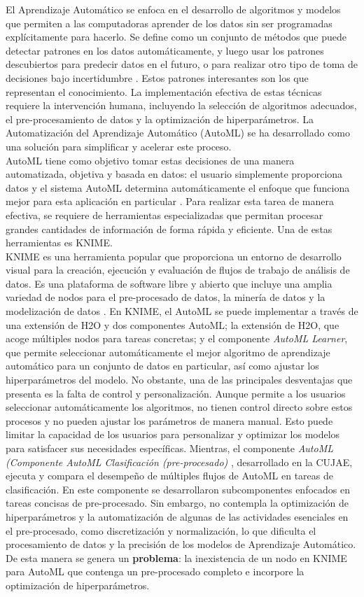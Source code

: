 El Aprendizaje Automático se enfoca en el desarrollo de algoritmos y modelos que permiten a las computadoras aprender de los datos sin ser programadas explícitamente para hacerlo. Se define como un conjunto de métodos que puede detectar patrones en los datos automáticamente, y luego usar los patrones descubiertos para predecir datos en el futuro, o para realizar otro tipo de toma de decisiones bajo incertidumbre \citep{murphy2012machine}. Estos patrones interesantes son los que representan el conocimiento. La implementación efectiva de estas técnicas requiere la intervención humana, incluyendo la selección de algoritmos adecuados, el pre-procesamiento de datos y la optimización de hiperparámetros. La Automatización del Aprendizaje Automático (AutoML) se ha desarrollado como una solución para simplificar y acelerar este proceso. \\
 AutoML tiene como objetivo tomar estas decisiones de una manera automatizada, objetiva y basada en datos: el usuario simplemente proporciona datos y el sistema AutoML determina automáticamente el enfoque que funciona mejor para esta aplicación en particular \citep{hutter2019automated}. Para realizar esta tarea de manera efectiva, se requiere de herramientas especializadas que permitan procesar grandes cantidades de información de forma rápida y eficiente. Una de estas herramientas es KNIME.\\
KNIME es una herramienta popular que proporciona un entorno de desarrollo visual para la creación, ejecución y evaluación de flujos de trabajo de análisis de datos. Es una plataforma de software libre y abierto que incluye una amplia variedad de nodos para el pre-procesado de datos, la minería de datos y la modelización de datos \citep{knime2023}. En KNIME, el AutoML se puede implementar a través de una extensión de H2O y dos componentes AutoML; la extensión de H2O, que acoge múltiples nodos para tareas concretas; y el componente \textit{AutoML Learner}, que permite seleccionar automáticamente el mejor algoritmo de aprendizaje automático para un conjunto de datos en particular, así como ajustar los hiperparámetros del modelo. No obstante, una de las principales desventajas que presenta es la falta de control y personalización. Aunque permite a los usuarios seleccionar automáticamente los algoritmos, no tienen control directo sobre estos procesos y no pueden ajustar los parámetros de manera manual. Esto puede limitar la capacidad de los usuarios para personalizar y optimizar los modelos para satisfacer sus necesidades específicas. Mientras, el componente \textit{AutoML (Componente AutoML Clasificación (pre-procesado)} \citep{Carrazana2022}, desarrollado en la CUJAE, ejecuta y compara el desempeño de múltiples flujos de AutoML en tareas de clasificación. En este componente se desarrollaron subcomponentes enfocados en tareas concisas de pre-procesado. Sin embargo, no contempla la optimización de hiperparámetros y la automatización de algunas de las actividades esenciales en el pre-procesado, como discretización y normalización, lo que dificulta el procesamiento de datos y la precisión de los modelos de Aprendizaje Automático. De esta manera se genera un \textbf{problema}: la inexistencia de un nodo en KNIME para AutoML que contenga un pre-procesado completo e incorpore la optimización de hiperparámetros. \\
